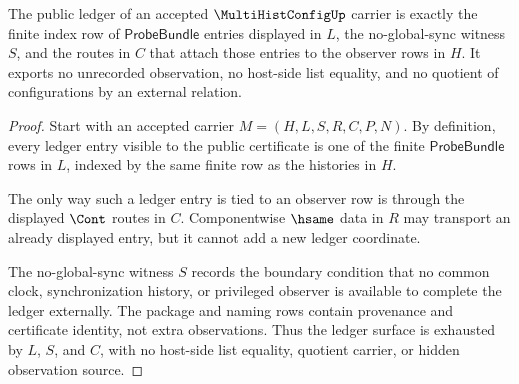 \begin{theorem}
\label{thm:multi-hist-config-finite-ledger-obligations}
The public ledger of an accepted $\MultiHistConfigUp$ carrier is exactly the finite index row of $\mathsf{ProbeBundle}$ entries displayed in $L$, the no-global-sync witness $S$, and the routes in $C$ that attach those entries to the observer rows in $H$. It exports no unrecorded observation, no host-side list equality, and no quotient of configurations by an external relation.
\end{theorem}
\begin{proof}
Start with an accepted carrier $M=(H,L,S,R,C,P,N)$. By definition, every ledger entry visible to the public certificate is one of the finite $\mathsf{ProbeBundle}$ rows in $L$, indexed by the same finite row as the histories in $H$.

The only way such a ledger entry is tied to an observer row is through the displayed $\Cont$ routes in $C$. Componentwise $\hsame$ data in $R$ may transport an already displayed entry, but it cannot add a new ledger coordinate.

The no-global-sync witness $S$ records the boundary condition that no common clock, synchronization history, or privileged observer is available to complete the ledger externally. The package and naming rows contain provenance and certificate identity, not extra observations. Thus the ledger surface is exhausted by $L$, $S$, and $C$, with no host-side list equality, quotient carrier, or hidden observation source.
\end{proof}

